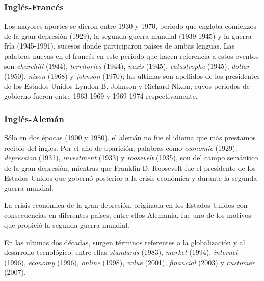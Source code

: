
\subsubsection*{Inglés-Francés} %

Los mayores aportes se dieron entre 1930 y 1970, periodo que engloba comienzos de
la gran depresión (1929), la segunda guerra mundial (1939-1945) y la guerra fría (1945-1991), sucesos donde participaron países de ambas lenguas. Las palabras nuevas en el francés en este periodo que hacen referencia a estos eventos son \textit{churchill} (1944), \textit{territories} (1944), \textit{nazis} (1945), \textit{catastrophe} (1945), \textit{dollar} (1950), \textit{nixon} (1968) y \textit{johnson} (1970); las ultimas son apellidos de los presidentes de los Estados Unidos  Lyndon B. Johnson y Richard Nixon, cuyos periodos de gobierno fueron  entre 1963-1969 y 1969-1974 respectivamente.

\subsubsection*{Inglés-Alemán} %

Sólo  en dos épocas (1900  y 1980), el alemán no fue el idioma que más prestamos recibió  del ingles. Por el año de aparición, palabras como \textit{economic} (1929), \textit{depression} (1931), \textit{investment} (1933) y \textit{roosevelt} (1935), son del campo semántico de la gran depresión,  mientras que  Franklin D. Roosevelt fue el presidente de los Estados Unidos que gobernó posterior a la crisis económica y durante la segunda guerra mundial. 

La crisis económica de la gran depresión, originada en los Estados Unidos con consecuencias en diferentes países, entre ellos  Alemania, fue uno de los motivos que propició la segunda guerra mundial.

En las ultimas dos décadas, surgen términos referentes a la globalización y al desarrollo tecnológico, entre ellas \textit{standards} (1983), \textit{market} (1994), \textit{internet} (1996), \textit{economy} (1996), \textit{online} (1998), \textit{value} (2001), \textit{financial} (2003) y \textit{customer} (2007). 

